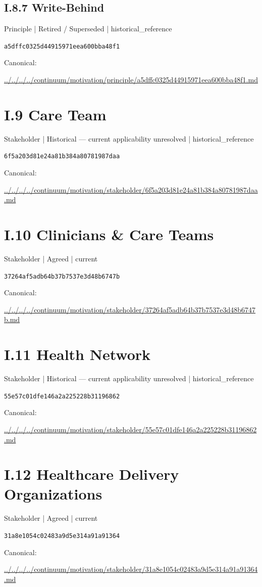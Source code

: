 \documentclass[10pt,a4paper]{article}
\begin{document}
\subsection*{I.8.7 Write-Behind}
{\small Principle | Retired / Superseded | historical\_reference}\par
\texttt{a5dffc0325d44915971eea600bba48f1}\par
Canonical: \par
{\footnotesize\url{../../../../continuum/motivation/principle/a5dffc0325d44915971eea600bba48f1.md}}\par
\section*{I.9 Care Team}
{\small Stakeholder | Historical — current applicability unresolved | historical\_reference}\par
\texttt{6f5a203d81e24a81b384a80781987daa}\par
Canonical: \par
{\footnotesize\url{../../../../continuum/motivation/stakeholder/6f5a203d81e24a81b384a80781987daa.md}}\par
\section*{I.10 Clinicians \& Care Teams}
{\small Stakeholder | Agreed | current}\par
\texttt{37264af5adb64b37b7537e3d48b6747b}\par
Canonical: \par
{\footnotesize\url{../../../../continuum/motivation/stakeholder/37264af5adb64b37b7537e3d48b6747b.md}}\par
\section*{I.11 Health Network}
{\small Stakeholder | Historical — current applicability unresolved | historical\_reference}\par
\texttt{55e57c01dfe146a2a225228b31196862}\par
Canonical: \par
{\footnotesize\url{../../../../continuum/motivation/stakeholder/55e57c01dfe146a2a225228b31196862.md}}\par
\section*{I.12 Healthcare Delivery Organizations}
{\small Stakeholder | Agreed | current}\par
\texttt{31a8e1054c02483a9d5e314a91a91364}\par
Canonical: \par
{\footnotesize\url{../../../../continuum/motivation/stakeholder/31a8e1054c02483a9d5e314a91a91364.md}}\par
\end{document}
